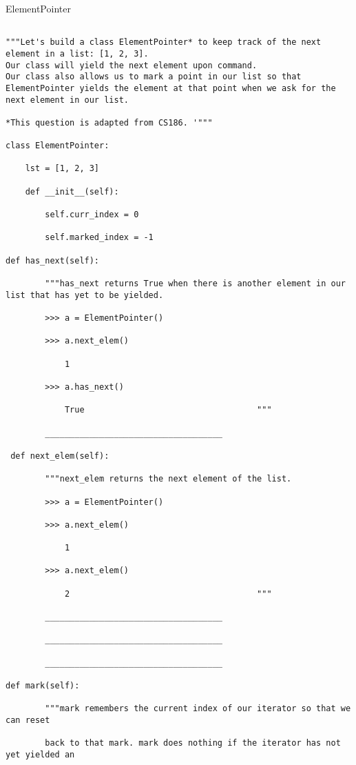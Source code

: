 \documentclass{exam}
\begin{document}
\begin{questions}
\clearpage
\item ElementPointer
 
 \begin{lstlisting}
 
"""Let's build a class ElementPointer* to keep track of the next element in a list: [1, 2, 3].
Our class will yield the next element upon command.
Our class also allows us to mark a point in our list so that ElementPointer yields the element at that point when we ask for the next element in our list.

*This question is adapted from CS186. '"""

class ElementPointer:

	lst = [1, 2, 3]
	
	def __init__(self):
	
		self.curr_index = 0
				
		self.marked_index = -1

def has_next(self):
		
		"""has_next returns True when there is another element in our list that has yet to be yielded.
		
		>>> a = ElementPointer()
		
		>>> a.next_elem()
		
			1
		
		>>> a.has_next()
		
			True		                           """
		
		____________________________________
		
 def next_elem(self):
		
		"""next_elem returns the next element of the list.
		
		>>> a = ElementPointer()
		
		>>> a.next_elem()
		
			1
		
		>>> a.next_elem()
		
			2                                      """
		
		____________________________________
		
		____________________________________
		
		____________________________________
        
def mark(self):
		
		"""mark remembers the current index of our iterator so that we can reset
		
		back to that mark. mark does nothing if the iterator has not yet yielded an
		

\end{lstlisting}
\end{questions}
\end{document}
